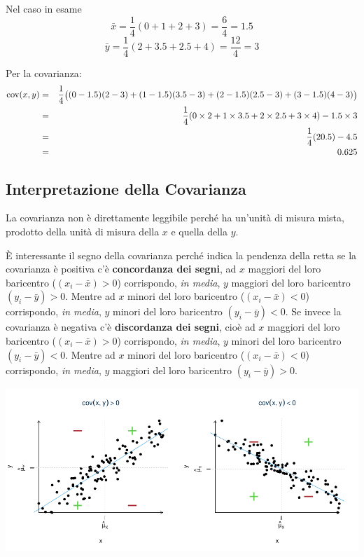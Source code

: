 \documentclass[
  11pt,
]{book}
\theoremstyle{mytheoremstyle}
\theoremstyle{mydefstyle}
\begin{document}
Nel caso in esame
\[\bar x=\frac 1 4(0+1+2+3)=\frac{6}{4}=1.5\]
\[\bar y=\frac 1 4(2+3.5+2.5+4)=\frac{12}{4}=3\]

Per la covarianza:
\begin{eqnarray*}
\text{cov}(x,y)&=&\scriptsize\frac 1 4\Big(( 0-1.5 ) ( 2-3 )+( 1-1.5 ) ( 3.5-3 )+( 2-1.5 ) ( 2.5-3 )+( 3-1.5 ) ( 4-3 )\Big)\\
&=& \frac 1 4(0 \times 2+1 \times 3.5+2 \times 2.5+3 \times 4)-1.5\times3\\
&=& \frac 1 4(20.5)-4.5\\
&=& 0.625
\end{eqnarray*}

\subsection{Interpretazione della Covarianza}\label{interpretazione-della-covarianza}

La covarianza non è direttamente leggibile perché ha un'unità di misura mista,
prodotto della unità di misura della \(x\) e quella della \(y\).

È interessante il segno della covarianza perché indica la pendenza della retta se la covarianza è positiva c'è \textbf{concordanza dei segni}, ad \(x\) maggiori del loro baricentro (\((x_i-\bar x)>0\)) corrispondo, \emph{in media}, \(y\) maggiori del loro baricentro \((y_i-\bar y)>0\). Mentre ad \(x\) minori del loro baricentro (\((x_i-\bar x)<0\)) corrispondo, \emph{in media}, \(y\) minori del loro baricentro \((y_i-\bar y)<0\). Se invece la covarianza è negativa c'è \textbf{discordanza dei segni}, cioè ad \(x\) maggiori del loro baricentro (\((x_i-\bar x)>0\)) corrispondo, \emph{in media}, \(y\) minori del loro baricentro \((y_i-\bar y)<0\). Mentre ad \(x\) minori del loro baricentro (\((x_i-\bar x)<0\)) corrispondo, \emph{in media}, \(y\) maggiori del loro baricentro \((y_i-\bar y)>0\).

\begin{center}\includegraphics{Appunti_di_Statistica_2025_files/figure-latex/17-regressione-I-34-1} \end{center}
\end{document}
